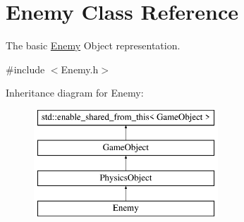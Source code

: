 \hypertarget{class_enemy}{}\section{Enemy Class Reference}
\label{class_enemy}


The basic \hyperlink{class_enemy}{Enemy} Object representation.  




{\ttfamily \#include $<$Enemy.\+h$>$}

Inheritance diagram for Enemy\+:\begin{figure}[H]
\begin{center}
\leavevmode
\includegraphics[height=4.000000cm]{dd/d7a/class_enemy}
\end{center}
\end{figure}
